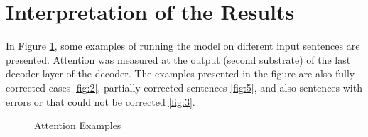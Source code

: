 \documentclass{article}
\begin{document}
    \section{Interpretation of the Results}
        
        In Figure \ref{fig:attention-examples}, some examples of running the model on different input sentences are presented. Attention was measured at the output (second substrate) of the last decoder layer of the decoder. The examples presented in the figure  are also fully corrected cases \ref{fig:2}, partially corrected sentences \ref{fig:5}, and also sentences with errors or that could not be corrected \ref{fig:3}.
        
        \begin{figure}[htbp]
            \centering
            \hfill
            \caption{Attention Examples}
            \label{fig:attention-examples}
        \end{figure}
        
\end{document}
